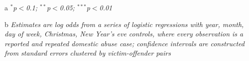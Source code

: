 \documentclass[12pt, a4paper]{article}
\begin{document}
\begin{table}
\begin{threeparttable}
\begin{tablenotes}
      \item[a] \textit{$^{*}$p$<$0.1; $^{**}$p$<$0.05; $^{***}$p$<$0.01}
      \item[b] \textit{Estimates are log odds from a series of logistic regressions with year, month, day of week, Christmas, New Year's eve controls, where every observation is a reported and repeated domestic abuse case; confidence intervals are constructed from standard errors clustered by victim-offender pairs}
    \end{tablenotes}
\end{threeparttable}
\end{table}





\end{document}
